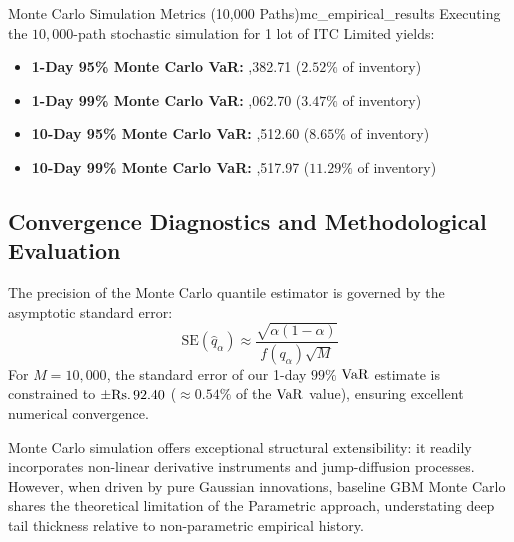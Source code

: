 \begin{empiricalbox}{Monte Carlo Simulation Metrics (10,000 Paths)}{mc_empirical_results}
Executing the $10,000$-path stochastic simulation for 1 lot of ITC Limited yields:
\begin{itemize}[leftmargin=1.5em, itemsep=1pt, parsep=0pt]
    \item \textbf{1-Day 95\% Monte Carlo VaR:} ,382.71 ($2.52\%$ of inventory)
    \item \textbf{1-Day 99\% Monte Carlo VaR:} ,062.70 ($3.47\%$ of inventory)
    \item \textbf{10-Day 95\% Monte Carlo VaR:} ,512.60 ($8.65\%$ of inventory)
    \item \textbf{10-Day 99\% Monte Carlo VaR:} ,517.97 ($11.29\%$ of inventory)
\end{itemize}
\end{empiricalbox}

\subsection{Convergence Diagnostics and Methodological Evaluation}

The precision of the Monte Carlo quantile estimator is governed by the asymptotic standard error:
\begin{equation}
    \text{SE}\left( \hat{q}_{\alpha} \right) \approx \frac{\sqrt{\alpha(1-\alpha)}}{f(q_{\alpha}) \sqrt{M}}
    \label{eq:mc_standard_error}
\end{equation}
For $M = 10,000$, the standard error of our 1-day $99\%$ $\operatorname{VaR}$ estimate is constrained to $\pm \text{\text{Rs.}\,}92.40$ ($\approx 0.54\%$ of the $\operatorname{VaR}$ value), ensuring excellent numerical convergence.

Monte Carlo simulation offers exceptional structural extensibility: it readily incorporates non-linear derivative instruments and jump-diffusion processes. However, when driven by pure Gaussian innovations, baseline GBM Monte Carlo shares the theoretical limitation of the Parametric approach, understating deep tail thickness relative to non-parametric empirical history.

\clearpage

